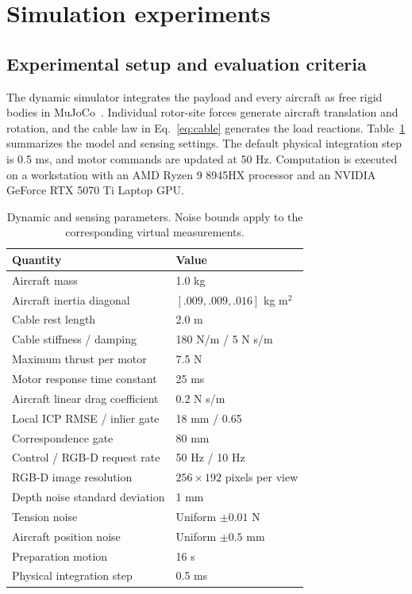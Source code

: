 \section{Simulation experiments}
\subsection{Experimental setup and evaluation criteria}
The dynamic simulator integrates the payload and every aircraft as free rigid bodies in MuJoCo~\cite{mujoco2012}. Individual rotor-site forces generate aircraft translation and rotation, and the cable law in Eq.~\eqref{eq:cable} generates the load reactions. Table~\ref{tab:parameters} summarizes the model and sensing settings. The default physical integration step is 0.5 ms, and motor commands are updated at 50 Hz. Computation is executed on a workstation with an AMD Ryzen 9 8945HX processor and an NVIDIA GeForce RTX 5070 Ti Laptop GPU.

\begin{table}[t]
\centering\small
\caption{Dynamic and sensing parameters. Noise bounds apply to the corresponding virtual measurements.}
\label{tab:parameters}
\begin{tabular}{@{}ll@{}}\toprule
Quantity & Value\\\midrule
Aircraft mass & 1.0 kg\\
Aircraft inertia diagonal & $[.009,.009,.016]$ kg m$^2$\\
Cable rest length & 2.0 m\\
Cable stiffness / damping & 180 N/m / 5 N s/m\\
Maximum thrust per motor & 7.5 N\\
Motor response time constant & 25 ms\\
Aircraft linear drag coefficient & 0.2 N s/m\\
Local ICP RMSE / inlier gate & 18 mm / 0.65\\
Correspondence gate & 80 mm\\
Control / RGB-D request rate & 50 Hz / 10 Hz\\
RGB-D image resolution & $256\times192$ pixels per view\\
Depth noise standard deviation & 1 mm\\
Tension noise & Uniform $\pm0.01$ N\\
Aircraft position noise & Uniform $\pm0.5$ mm\\
Preparation motion & 16 s\\
Physical integration step & 0.5 ms\\\bottomrule
\end{tabular}
\end{table}

